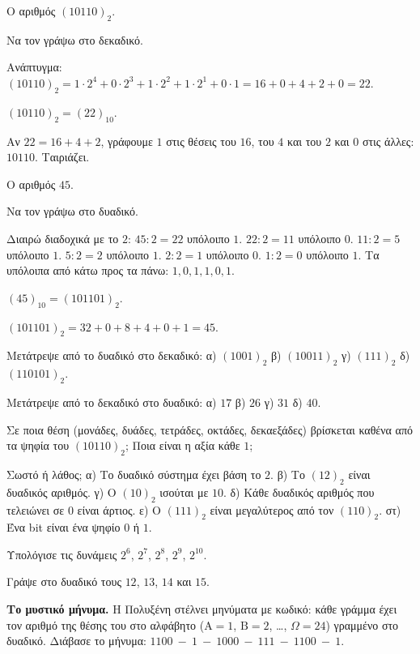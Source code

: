 \tixero Ο αριθμός $(10110)_2$.\par
\tithelo Να τον γράψω στο δεκαδικό.\par
\possindeo Ανάπτυγμα: $(10110)_2=1\cdot 2^4+0\cdot 2^3+1\cdot 2^2+1\cdot 2^1+0\cdot 1=16+0+4+2+0=22$.\par
\apantisi $(10110)_2=(22)_{10}$.\par
\elegxos Αν $22=16+4+2$, γράφουμε $1$ στις θέσεις του $16$, του $4$ και του $2$ και $0$ στις άλλες: $10110$. Ταιριάζει.

\tixero Ο αριθμός $45$.\par
\tithelo Να τον γράψω στο δυαδικό.\par
\possindeo Διαιρώ διαδοχικά με το $2$: $45:2=22$ υπόλοιπο $1$. $22:2=11$ υπόλοιπο $0$. $11:2=5$ υπόλοιπο $1$. $5:2=2$ υπόλοιπο $1$. $2:2=1$ υπόλοιπο $0$. $1:2=0$ υπόλοιπο $1$. Τα υπόλοιπα από κάτω προς τα πάνω: $1,0,1,1,0,1$.\par
\apantisi $(45)_{10}=(101101)_2$.\par
\elegxos $(101101)_2=32+0+8+4+0+1=45$.



\ex Μετάτρεψε από το δυαδικό στο δεκαδικό: α) $(1001)_2$ \quad β) $(10011)_2$ \quad γ) $(111)_2$ \quad δ) $(110101)_2$.

\ex Μετάτρεψε από το δεκαδικό στο δυαδικό: α) $17$ \quad β) $26$ \quad γ) $31$ \quad δ) $40$.

\ex Σε ποια θέση (μονάδες, δυάδες, τετράδες, οκτάδες, δεκαεξάδες) βρίσκεται καθένα από τα ψηφία του $(10110)_2$; Ποια είναι η αξία κάθε $1$;

\ex Σωστό ή λάθος; α) Το δυαδικό σύστημα έχει βάση το $2$. \quad β) Το $(12)_2$ είναι δυαδικός αριθμός. \quad γ) Ο $(10)_2$ ισούται με $10$. \quad δ) Κάθε δυαδικός αριθμός που τελειώνει σε $0$ είναι άρτιος. \quad ε) Ο $(111)_2$ είναι μεγαλύτερος από τον $(110)_2$. \quad στ) Ένα bit είναι ένα ψηφίο $0$ ή $1$.

\ex Υπολόγισε τις δυνάμεις $2^6$, $2^7$, $2^8$, $2^9$, $2^{10}$.

\ex Γράψε στο δυαδικό τους $12$, $13$, $14$ και $15$.


\ex \textbf{Το μυστικό μήνυμα.} Η Πολυξένη στέλνει μηνύματα με κωδικό: κάθε γράμμα έχει τον αριθμό της θέσης του στο αλφάβητο ($\mathrm{Α}=1$, $\mathrm{Β}=2$, \dots, $\Omega=24$) γραμμένο στο δυαδικό. Διάβασε το μήνυμα: $1100\ -\ 1\ -\ 1000\ -\ 111\ -\ 1100\ -\ 1$.

